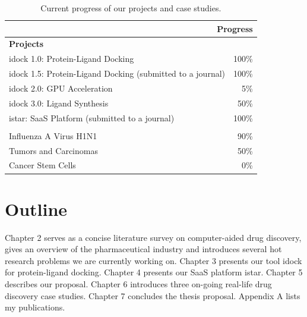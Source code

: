 \begin{table}
\centering
\begin{tabular*}
{\linewidth}
{@{\extracolsep{\fill}}lr}
\toprule
\multicolumn{2}{r}{\textbf{Progress}}\\
\midrule
\multicolumn{2}{l}{\textbf{Projects}}\\
idock 1.0: Protein-Ligand Docking \citep{1153} & 100\% \\
idock 1.5: Protein-Ligand Docking (submitted to a journal) & 100\% \\
idock 2.0: GPU Acceleration &  5\% \\
idock 3.0: Ligand Synthesis & 50\% \\
istar: SaaS Platform (submitted to a journal) & 100\% \\
\noalign{\smallskip\smallskip}
\multicolumn{2}{l}{\textbf{Case studies}}\\
Influenza A Virus H1N1 & 90\% \\
Tumors and Carcinomas & 50\% \\
Cancer Stem Cells & 0\% \\
\bottomrule
\end{tabular*}
\caption{Current progress of our projects and case studies.}
\label{Introduction:Progress}
\end{table}

\section{Outline}

Chapter 2 serves as a concise literature survey on computer-aided drug discovery, gives an overview of the pharmaceutical industry and introduces several hot research problems we are currently working on. Chapter 3 presents our tool idock for protein-ligand docking. Chapter 4 presents our SaaS platform istar. Chapter 5 describes our proposal. Chapter 6 introduces three on-going real-life drug discovery case studies. Chapter 7 concludes the thesis proposal. Appendix A lists my publications.

\chapterend
